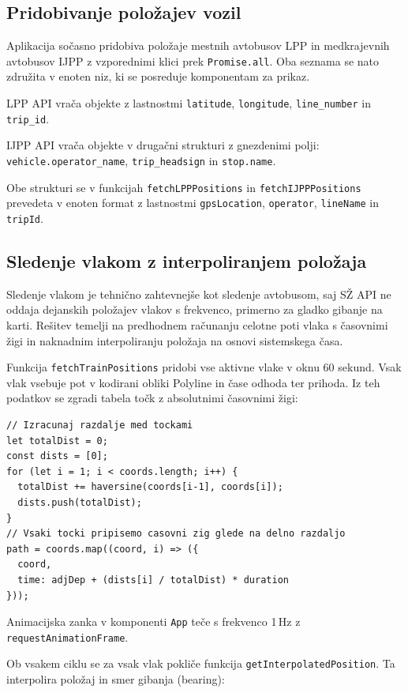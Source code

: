 \documentclass[12pt]{article}
\begin{document}
\subsection{Pridobivanje položajev vozil}

Aplikacija sočasno pridobiva položaje mestnih avtobusov LPP in medkrajevnih avtobusov IJPP z vzporednimi klici prek \texttt{Promise.all}. Oba seznama se nato združita v enoten niz, ki se posreduje komponentam za prikaz.

LPP API vrača objekte z lastnostmi \texttt{latitude}, \texttt{longitude}, \texttt{line\_number} in \texttt{trip\_id}.

IJPP API vrača objekte v drugačni strukturi z gnezdenimi polji:
\texttt{vehicle.operator\_name}, \texttt{trip\_headsign} in \texttt{stop.name}.

Obe strukturi se v funkcijah \texttt{fetchLPPPositions} in \texttt{fetchIJPPPositions} prevedeta v enoten format z lastnostmi \texttt{gpsLocation}, \texttt{operator}, \texttt{lineName} in \texttt{tripId}.

\subsection{Sledenje vlakom z interpoliranjem položaja}

Sledenje vlakom je tehnično zahtevnejše kot sledenje avtobusom, saj SŽ API ne oddaja dejanskih položajev vlakov s frekvenco, primerno za gladko gibanje na karti. Rešitev temelji na predhodnem računanju celotne poti vlaka s časovnimi žigi in naknadnim interpoliranju položaja na osnovi sistemskega časa.

Funkcija \texttt{fetchTrainPositions} pridobi vse aktivne vlake v oknu 60 sekund. Vsak vlak vsebuje pot v kodirani obliki Polyline in čase odhoda ter prihoda. Iz teh podatkov se zgradi tabela točk z absolutnimi časovnimi žigi:

\begin{lstlisting}[caption={Gradnja časovno označene poti vlaka}, label={lst:trainpath}]
// Izracunaj razdalje med tockami
let totalDist = 0;
const dists = [0];
for (let i = 1; i < coords.length; i++) {
  totalDist += haversine(coords[i-1], coords[i]);
  dists.push(totalDist);
}
// Vsaki tocki pripisemo casovni zig glede na delno razdaljo
path = coords.map((coord, i) => ({
  coord,
  time: adjDep + (dists[i] / totalDist) * duration
}));
\end{lstlisting}

\begin{sloppypar}
Animacijska zanka v komponenti \texttt{App} teče s frekvenco 1\,Hz z \mbox{\texttt{requestAnimationFrame}}.

Ob vsakem ciklu se za vsak vlak pokliče funkcija \texttt{getInterpolatedPosition}. Ta interpolira položaj in smer gibanja (bearing):
\end{sloppypar}
\end{document}
